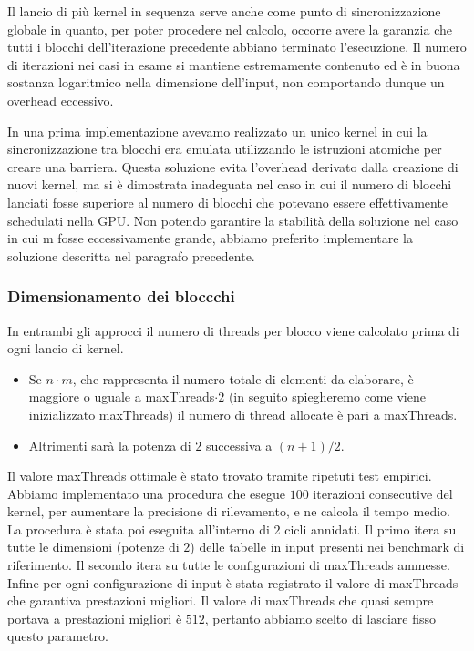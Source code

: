 \documentclass[a4paper]{article}   %
\begin{document}
Il lancio di più kernel in sequenza serve anche come punto di sincronizzazione globale in quanto, per poter procedere nel calcolo, occorre avere la garanzia che tutti i blocchi dell’iterazione precedente abbiano terminato l’esecuzione. Il numero di iterazioni nei casi in esame si mantiene estremamente contenuto ed è in buona sostanza logaritmico nella dimensione dell’input, non comportando dunque un overhead eccessivo. 

In una prima implementazione avevamo realizzato un unico kernel in cui la sincronizzazione tra blocchi era emulata utilizzando le istruzioni atomiche per creare una barriera. Questa soluzione evita l’overhead derivato dalla creazione di nuovi kernel, ma si è dimostrata inadeguata nel caso in cui il numero di blocchi lanciati fosse superiore al numero di blocchi che potevano essere effettivamente schedulati nella GPU. Non potendo garantire la stabilità della soluzione nel caso in cui m fosse eccessivamente grande, abbiamo preferito implementare la soluzione descritta nel paragrafo precedente.

\subsubsection{Dimensionamento dei bloccchi}
In entrambi gli approcci il numero di threads per blocco viene calcolato prima di ogni lancio di kernel. 
\begin{itemize}
\item Se $n \cdot m$, che rappresenta il numero totale di elementi da elaborare, è maggiore o uguale a maxThreads$ \cdot 2$ (in seguito spiegheremo come viene inizializzato maxThreads) il numero di thread allocate è pari a maxThreads.
\item Altrimenti sarà la potenza di $2$ successiva a $(n+1)/2$.
\end{itemize}
Il valore maxThreads ottimale è stato trovato tramite ripetuti test empirici. Abbiamo implementato una procedura che esegue $100$ iterazioni consecutive del kernel, per aumentare la precisione di rilevamento, e ne calcola il tempo medio. La procedura è stata poi eseguita all’interno di $2$ cicli annidati. Il primo itera su tutte le dimensioni (potenze di $2$) delle tabelle in input presenti nei benchmark di riferimento. Il secondo itera su tutte le configurazioni di maxThreads ammesse. Infine per ogni configurazione di input è stata registrato il valore di maxThreads che garantiva prestazioni migliori. 
Il valore di maxThreads che quasi sempre portava a prestazioni migliori è $512$, pertanto abbiamo scelto di lasciare fisso questo parametro.
\end{document}
